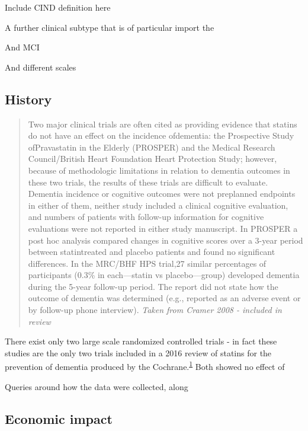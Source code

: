 \documentclass[a4paper, twoside]{templates/ociamthesis}
\begin{document}
Include CIND definition here

A further clinical subtype that is of particular import the

And MCI

And different scales

\hypertarget{history}{%
\subsection{History}\label{history}}

\begin{quote}
Two major clinical trials are often cited as providing evidence that statins do not have an effect on the incidence ofdementia: the Prospective Study ofPravastatin in the Elderly (PROSPER) and the Medical Research
Council/British Heart Foundation Heart Protection Study; however, because of methodologic limitations in relation to dementia outcomes in these two trials, the results of these trials are difficult to evaluate. Dementia incidence or cognitive outcomes were not preplanned endpoints in either of them, neither study included a clinical cognitive evaluation, and numbers of patients with follow-up information for cognitive evaluations were not reported in either study manuscript. In PROSPER a post hoc analysis compared changes in cognitive scores over a 3-year period between statintreated and placebo patients and found no significant differences. In the MRC/BHF HPS trial,27
similar percentages of participants (0.3\% in each---statin vs placebo---group) developed dementia during the 5-year follow-up period. The report did not state how the outcome of dementia was determined (e.g., reported as an adverse event or by follow-up phone interview).
\emph{Taken from Cramer 2008 - included in review}
\end{quote}

There exist only two large scale randomized controlled trials - in fact these studies are the only two trials included in a 2016 review of statins for the prevention of dementia produced by the Cochrane.\textsuperscript{\protect\hyperlink{ref-mcguinness2016b}{1}} Both showed no effect of

Queries around how the data were collected, along

\hypertarget{economic-impact}{%
\subsection{Economic impact}\label{economic-impact}}
\end{document}
